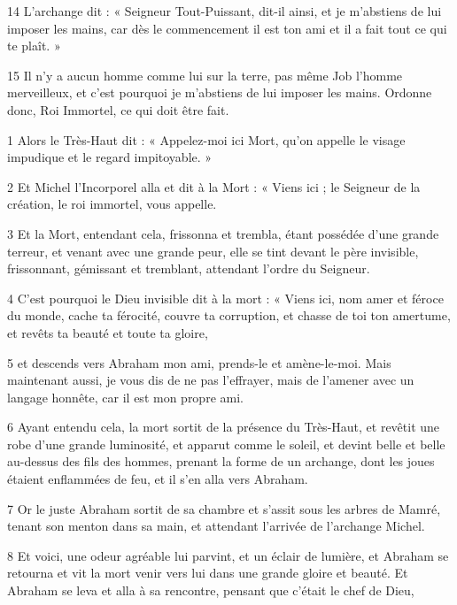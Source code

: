 \par 14 L'archange dit : « Seigneur Tout-Puissant, dit-il ainsi, et je m'abstiens de lui imposer les mains, car dès le commencement il est ton ami et il a fait tout ce qui te plaît. »

\par 15 Il n'y a aucun homme comme lui sur la terre, pas même Job l'homme merveilleux, et c'est pourquoi je m'abstiens de lui imposer les mains. Ordonne donc, Roi Immortel, ce qui doit être fait.


\par 1 Alors le Très-Haut dit : « Appelez-moi ici Mort, qu'on appelle le visage impudique et le regard impitoyable. »

\par 2 Et Michel l'Incorporel alla et dit à la Mort : « Viens ici ; le Seigneur de la création, le roi immortel, vous appelle.

\par 3 Et la Mort, entendant cela, frissonna et trembla, étant possédée d'une grande terreur, et venant avec une grande peur, elle se tint devant le père invisible, frissonnant, gémissant et tremblant, attendant l'ordre du Seigneur.

\par 4 C'est pourquoi le Dieu invisible dit à la mort : « Viens ici, nom amer et féroce du monde, cache ta férocité, couvre ta corruption, et chasse de toi ton amertume, et revêts ta beauté et toute ta gloire,

\par 5 et descends vers Abraham mon ami, prends-le et amène-le-moi. Mais maintenant aussi, je vous dis de ne pas l'effrayer, mais de l'amener avec un langage honnête, car il est mon propre ami.

\par 6 Ayant entendu cela, la mort sortit de la présence du Très-Haut, et revêtit une robe d'une grande luminosité, et apparut comme le soleil, et devint belle et belle au-dessus des fils des hommes, prenant la forme de un archange, dont les joues étaient enflammées de feu, et il s'en alla vers Abraham.

\par 7 Or le juste Abraham sortit de sa chambre et s'assit sous les arbres de Mamré, tenant son menton dans sa main, et attendant l'arrivée de l'archange Michel.

\par 8 Et voici, une odeur agréable lui parvint, et un éclair de lumière, et Abraham se retourna et vit la mort venir vers lui dans une grande gloire et beauté. Et Abraham se leva et alla à sa rencontre, pensant que c'était le chef de Dieu,


